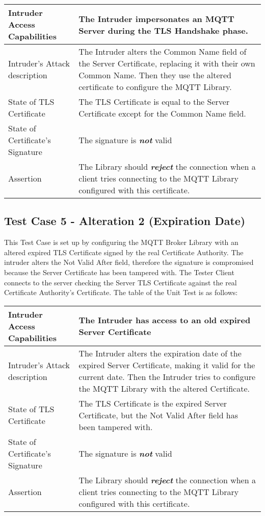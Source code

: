 \documentclass[binding=0.6cm,noexaminfo]{sapthesis}
\begin{document}
\begin{center}
\begin{tabular}{| p{6cm} | p{6cm} |}
\hline
Intruder Access Capabilities & The Intruder impersonates an MQTT Server during the TLS Handshake phase. \\
\hline
Intruder’s Attack description & The Intruder alters the Common Name field of the Server Certificate, replacing it with their own Common Name. Then they use the altered certificate to configure the MQTT Library. \\
\hline
State of TLS Certificate & The TLS Certificate is equal to the Server Certificate except for the Common Name field. \\
\hline
State of Certificate’s Signature & The signature is \textbf{\textit{not}} valid \\
\hline
Assertion & The Library should \textbf{\textit{reject}} the connection when a client tries connecting to the MQTT Library configured with this certificate. \\
\hline
\end{tabular}
\end{center}

\subsection{Test Case 5 - Alteration 2 (Expiration Date)}
This Test Case is set up by configuring the MQTT Broker Library with an altered expired TLS Certificate signed by the real Certificate Authority. The intruder alters the Not Valid After field, therefore the signature is compromised because the Server Certificate has been tampered with. The Tester Client connects to the server checking the Server TLS Certificate against the real Certificate Authority’s Certificate. The table of the Unit Test is as follows:

\begin{center}
\begin{tabular}{| p{6cm} | p{6cm} |}
\hline
Intruder Access Capabilities & The Intruder has access to an old expired Server Certificate \\
\hline
Intruder’s Attack description & The Intruder alters the expiration date of the expired Server Certificate, making it valid for the current date. Then the Intruder tries  to configure the MQTT Library with the altered Certificate. \\
\hline
State of TLS Certificate & The TLS Certificate is the expired Server Certificate, but the Not Valid After field has been tampered with. \\
\hline
State of Certificate’s Signature & The signature is \textbf{\textit{not}} valid \\
\hline
Assertion & The Library should \textbf{\textit{reject}} the connection when a client tries connecting to the MQTT Library configured with this certificate. \\
\hline
\end{tabular}
\end{center}
\end{document}
